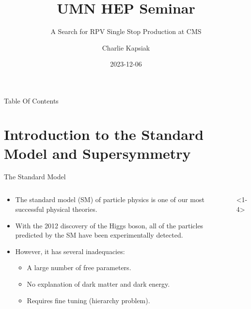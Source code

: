 \documentclass[]{beamer}
\author[Charlie Kapsiak]{Charlie Kapsiak\inst{1}}
\institute[UMN]{\inst{1} University of Minnesota}
\title{UMN HEP Seminar}
\subtitle{A Search for RPV Single Stop Production at CMS}
\date{2023-12-06}
\def\pw{0.94} %
\def\nfermioncols{3} %
\def\nbosoncols{2} %
\def\headers{
  \fill[mylightblue,rounded corners=4pt] %
  (1-\pw/2,4.74) rectangle (3+\pw/2,5.1)
  node[midway,header] {%
    three generations of matter\\[0pt]
    (fermions)};
  \node[above=0pt,scale=0.75] at (1,4.5) {I};
  \node[above=0pt,scale=0.75] at (2,4.5) {II};
  \node[above=0pt,scale=0.75] at (3,4.5) {III};
  \ifnum\nfermioncols>3 %
    \fill[mylightblue,rounded corners=4pt] %
    (4-\pw/2,4.74) rectangle (\nfermioncols+\pw/2,5.1)
    node[midway,header] {%
      three generations of antimatter\\[0pt]
      (antifermions)};
    \node[above=0pt,scale=0.75] at (4,4.5) {I};
    \node[above=0pt,scale=0.75] at (5,4.5) {II};
    \node[above=0pt,scale=0.75] at (6,4.5) {III};
  \fi
  \fill[mylightblue,rounded corners=4pt] %
  (\nfermioncols+1-\pw/2,4.74) rectangle (\nfermioncols+\nbosoncols+\pw/2,5.1)
  node[midway,header] {%
    interactions / forces\\[0pt]
    (bosons)};
}
\def\legend{
  \node[below left,proplabel]
  at (0.5,4+0.50*\pw) {\strut mass};
  \node[below left,proplabel]
  at (0.5,4+0.35*\pw) {\strut charge};
  \node[below left,proplabel]
  at (0.5,4+0.20*\pw) {\strut spin};
}
\begin{document}
{
  \maketitle
}
\begin{frame}{Table Of Contents}
  \tableofcontents
\end{frame}

\section[Introduction]{Introduction to the Standard Model and Supersymmetry}
\label{sec:introduction}


\begin{frame}{The Standard Model}
  \begin{columns}
    \begin{column}{0.6\textwidth}
      \begin{itemize}
      \item<1-> The standard model (SM) of particle physics is one of our most successful physical theories.
      \item<2-> With the 2012 discovery of the Higgs boson, all of the particles predicted by the SM have been experimentally detected.
      \item<3-> However, it has several inadequacies:
        \begin{itemize}[<+(3)->]
        \item A large number of free parameters.
        \item No explanation of dark matter and dark energy.
        \item Requires fine tuning (hierarchy problem).
        \end{itemize}
      \end{itemize}
    \end{column}
    \begin{column}{0.4\textwidth}
      \begin{onlyenv}<1-4>
\end{onlyenv}
\end{column}
\end{columns}
\end{frame}
\end{document}
